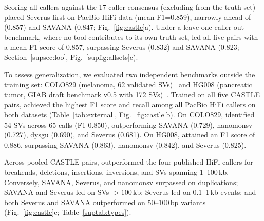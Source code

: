{Scoring all callers against the 17-caller consensus (excluding \tool from the truth set) placed Severus first on PacBio HiFi data (mean F1=0.859), narrowly ahead of \tool (0.857) and SAVANA (0.847; Fig.~\ref{fig:castle}a). Under a leave-one-caller-out benchmark, where no tool contributes to its own truth set, \tool led all five pairs with a mean F1 score of 0.857, surpassing Severus (0.832) and SAVANA (0.823; Section~\ref{supsec:loo}, Fig.~\ref{supfig:allsets}c).

To assess generalization, we evaluated two independent benchmarks outside the training set: COLO829 (melanoma, 62 validated SVs)~\cite{colo829} and HG008 (pancreatic tumor, GIAB draft benchmark v0.5 with 172 SVs)~\cite{hg008}. Trained on all five CASTLE pairs, \tool achieved the highest F1 score and recall among all PacBio HiFi callers on both datasets (Table~\ref{tab:external}, Fig.~\ref{fig:castle}b). On COLO829, \tool identified 54 SVs across 65 calls (F1 0.850), outperforming SAVANA (0.729), nanomonsv (0.727), dysgu (0.690), and Severus (0.681). On HG008, \tool attained an F1 score of 0.886, surpassing SAVANA (0.863), nanomonsv (0.842), and Severus (0.825).

Across pooled CASTLE pairs, \tool outperformed the four published HiFi callers for breakends, deletions, insertions, inversions, and SVs spanning 1--100\,kb. Conversely, SAVANA, Severus, and nanomonsv surpassed \tool on duplications; SAVANA and Severus led on SVs $>100$\,kb; Severus led on 0.1--1\,kb events; and both Severus and SAVANA outperformed \tool on 50--100\,bp variants (Fig.~\ref{fig:castle}c; Table~\ref{suptab:types}).



}
